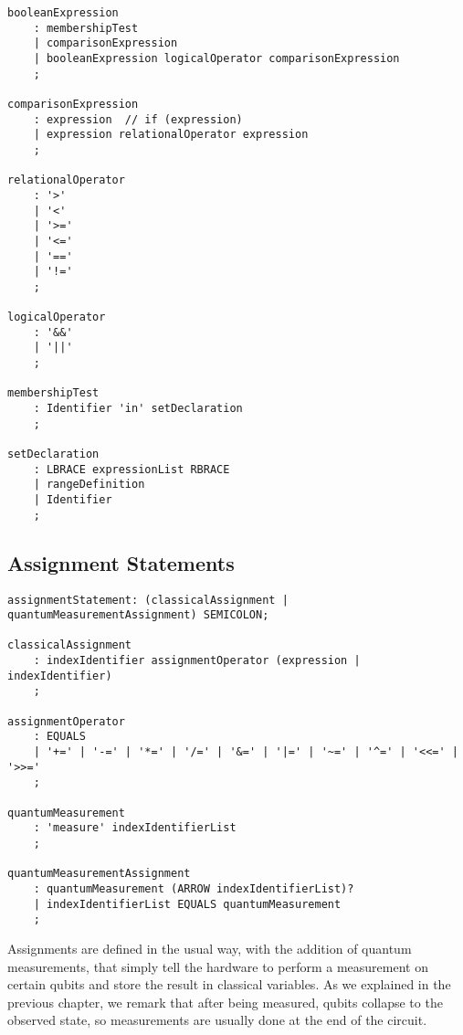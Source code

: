 \documentclass[12pt,a4paper]{report}
\theoremstyle{definition}
\theoremstyle{definition}
\theoremstyle{definition}
\begin{document}
\begin{lstlisting}
booleanExpression
    : membershipTest
    | comparisonExpression
    | booleanExpression logicalOperator comparisonExpression
    ;

comparisonExpression
    : expression  // if (expression)
    | expression relationalOperator expression
    ;

relationalOperator
    : '>'
    | '<'
    | '>='
    | '<='
    | '=='
    | '!='
    ;

logicalOperator
    : '&&'
    | '||'
    ;

membershipTest
    : Identifier 'in' setDeclaration
    ;

setDeclaration
    : LBRACE expressionList RBRACE
    | rangeDefinition
    | Identifier
    ;
\end{lstlisting}

\subsection{Assignment Statements}
\begin{lstlisting}
assignmentStatement: (classicalAssignment | quantumMeasurementAssignment) SEMICOLON;

classicalAssignment
    : indexIdentifier assignmentOperator (expression | indexIdentifier)
    ;

assignmentOperator
    : EQUALS
    | '+=' | '-=' | '*=' | '/=' | '&=' | '|=' | '~=' | '^=' | '<<=' | '>>='
    ;

quantumMeasurement
    : 'measure' indexIdentifierList
    ;

quantumMeasurementAssignment
    : quantumMeasurement (ARROW indexIdentifierList)?
    | indexIdentifierList EQUALS quantumMeasurement
    ;
\end{lstlisting}
Assignments are defined in the usual way, with the addition of quantum measurements, that simply tell the hardware to perform a measurement on certain qubits and store the result in classical variables. As we explained in the previous chapter, we remark that after being measured, qubits collapse to the observed state, so measurements are usually done at the end of the circuit.\\
\end{document}
